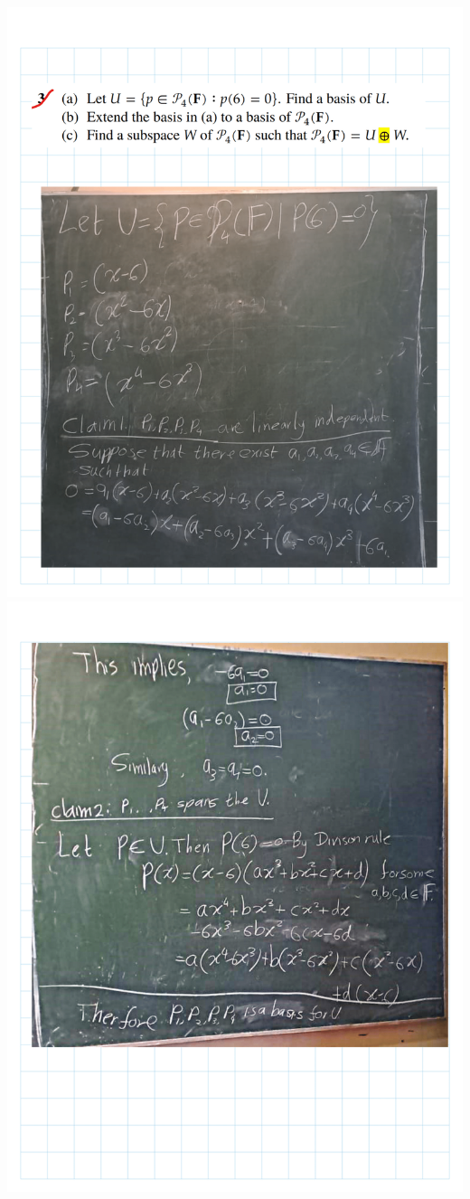 \documentclass[
]{book}
\theoremstyle{definition}
\theoremstyle{definition}
\theoremstyle{definition}
\theoremstyle{definition}
\theoremstyle{remark}
\begin{document}
\includegraphics{fig/Ex 2B and 2C/Ex 2c (8).png}
\includegraphics{fig/Ex 2B and 2C/Ex 2c (9).png}
\end{document}
